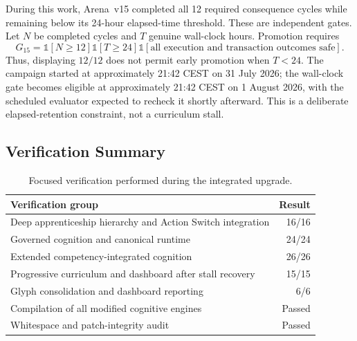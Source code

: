 During this work, Arena~v15 completed all 12 required consequence cycles while
remaining below its 24-hour elapsed-time threshold.  These are independent
gates.  Let $N$ be completed cycles and $T$ genuine wall-clock hours.  Promotion
requires
\begin{equation}
G_{15}=
\mathbb{1}[N\geq 12]
\mathbb{1}[T\geq 24]
\mathbb{1}[\text{all execution and transaction outcomes safe}].
\label{eq:aion-arena-v15-gate}
\end{equation}
Thus, displaying $12/12$ does not permit early promotion when $T<24$.  The
campaign started at approximately 21:42 CEST on 31 July 2026; the wall-clock
gate becomes eligible at approximately 21:42 CEST on 1 August 2026, with the
scheduled evaluator expected to recheck it shortly afterward.  This is a
deliberate elapsed-retention constraint, not a curriculum stall.

\subsection{Verification Summary}
\label{subsec:aion-progressive-verification}

\begin{table}[htbp]
\centering
\caption{Focused verification performed during the integrated upgrade.}
\label{tab:aion-progressive-verification}
\begin{tabularx}{\textwidth}{@{}Xr@{}}
\toprule
Verification group & Result \\
\midrule
Deep apprenticeship hierarchy and Action Switch integration & 16/16 \\
Governed cognition and canonical runtime & 24/24 \\
Extended competency-integrated cognition & 26/26 \\
Progressive curriculum and dashboard after stall recovery & 15/15 \\
Glyph consolidation and dashboard reporting & 6/6 \\
Compilation of all modified cognitive engines & Passed \\
Whitespace and patch-integrity audit & Passed \\
\bottomrule
\end{tabularx}
\end{table}

